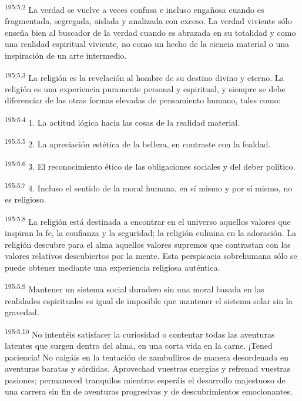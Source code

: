 \par
\textsuperscript{195:5.2} La verdad se vuelve a veces confusa e incluso engañosa cuando es fragmentada, segregada, aislada y analizada con exceso. La verdad viviente sólo enseña bien al buscador de la verdad cuando es abrazada en su totalidad y como una realidad espiritual viviente, no como un hecho de la ciencia material o una inspiración de un arte intermedio.

\par
\textsuperscript{195:5.3} La religión es la revelación al hombre de su destino divino y eterno. La religión es una experiencia puramente personal y espiritual, y siempre se debe diferenciar de las otras formas elevadas de pensamiento humano, tales como:

\par
\textsuperscript{195:5.4} 1. La actitud lógica hacia las cosas de la realidad material.

\par
\textsuperscript{195:5.5} 2. La apreciación estética de la belleza, en contraste con la fealdad.

\par
\textsuperscript{195:5.6} 3. El reconocimiento ético de las obligaciones sociales y del deber político.

\par
\textsuperscript{195:5.7} 4. Incluso el sentido de la moral humana, en sí mismo y por sí mismo, no es religioso.

\par
\textsuperscript{195:5.8} La religión está destinada a encontrar en el universo aquellos valores que inspiran la fe, la confianza y la seguridad; la religión culmina en la adoración. La religión descubre para el alma aquellos valores supremos que contrastan con los valores relativos descubiertos por la mente. Esta perspicacia sobrehumana sólo se puede obtener mediante una experiencia religiosa auténtica.

\par
\textsuperscript{195:5.9} Mantener un sistema social duradero sin una moral basada en las realidades espirituales es igual de imposible que mantener el sistema solar sin la gravedad.

\par
\textsuperscript{195:5.10} No intentéis satisfacer la curiosidad o contentar todas las aventuras latentes que surgen dentro del alma, en una corta vida en la carne. ¡Tened paciencia! No caigáis en la tentación de zambulliros de manera desordenada en aventuras baratas y sórdidas. Aprovechad vuestras energías y refrenad vuestras pasiones; permaneced tranquilos mientras esperáis el desarrollo majestuoso de una carrera sin fin de aventuras progresivas y de descubrimientos emocionantes.

